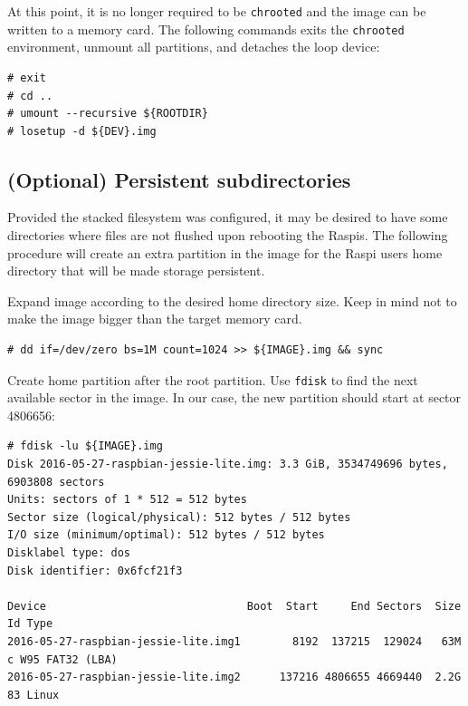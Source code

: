 At this point, it is no longer required to be \texttt{chrooted} and the image
can be written to a memory card. The following commands exits the \texttt{chrooted}
environment, unmount all partitions, and detaches the loop device:

\begin{lstlisting}[]
# exit
# cd ..
# umount --recursive ${ROOTDIR}
# losetup -d ${DEV}.img
\end{lstlisting}
\FloatBarrier
\vspace{-5mm}

\subsection{(Optional) Persistent subdirectories}

Provided the stacked filesystem was configured, it may be desired to have
some directories where files are not flushed upon rebooting the \ac{Raspi}s.
The following procedure will create an extra partition in the image for
the \ac{Raspi} users home directory that will be made storage persistent.

Expand image according to the desired home directory size. Keep in mind not
to make the image bigger than the target memory card.
\begin{lstlisting}[]
# dd if=/dev/zero bs=1M count=1024 >> ${IMAGE}.img && sync
\end{lstlisting}
\FloatBarrier
\vspace{-5mm}

Create home partition after the root partition. Use \texttt{fdisk} to
find the next available sector in the image. In our case, the new
partition should start at sector 4806656:
\begin{lstlisting}[]
# fdisk -lu ${IMAGE}.img
Disk 2016-05-27-raspbian-jessie-lite.img: 3.3 GiB, 3534749696 bytes, 6903808 sectors
Units: sectors of 1 * 512 = 512 bytes
Sector size (logical/physical): 512 bytes / 512 bytes
I/O size (minimum/optimal): 512 bytes / 512 bytes
Disklabel type: dos
Disk identifier: 0x6fcf21f3

Device                               Boot  Start     End Sectors  Size Id Type
2016-05-27-raspbian-jessie-lite.img1        8192  137215  129024   63M  c W95 FAT32 (LBA)
2016-05-27-raspbian-jessie-lite.img2      137216 4806655 4669440  2.2G 83 Linux
\end{lstlisting}
\FloatBarrier
\vspace{-5mm}

